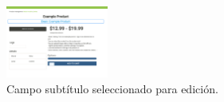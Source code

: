 \begin{figure}[H]
	\centering
	\includegraphics[width=0.3\textwidth]{figuras/productos/interfaz_edicion_editando_subtitulo.png}

	\caption{Campo subtítulo seleccionado para edición.}
	\label{figure:features:interfaz_edicion_editando_subtitulo}
\end{figure}

